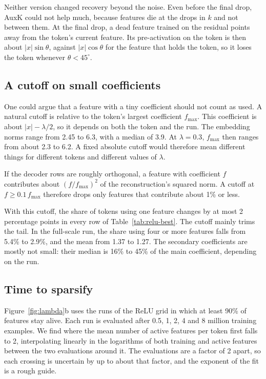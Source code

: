 \documentclass[11pt]{article}
\newcommand{\norm}[1]{\lvert #1\rvert}
\begin{document}
Neither version changed recovery beyond the noise. Even before the final drop, AuxK could not help much, because features die at the drops in $k$ and not between them. At the final drop, a dead feature trained on the residual points away from the token's current feature. Its pre-activation on the token is then about $\norm{x}\sin\theta$, against $\norm{x}\cos\theta$ for the feature that holds the token, so it loses the token whenever $\theta < 45^\circ$.

\subsection{A cutoff on small coefficients}
\label{app:cutoff}

One could argue that a feature with a tiny coefficient should not count as used. A natural cutoff is relative to the token's largest coefficient $f_{\max}$. This coefficient is about $\norm{x} - \lambda/2$, so it depends on both the token and the run. The embedding norms range from 2.45 to 6.3, with a median of 3.9. At $\lambda = 0.3$, $f_{\max}$ then ranges from about 2.3 to 6.2. A fixed absolute cutoff would therefore mean different things for different tokens and different values of $\lambda$.

If the decoder rows are roughly orthogonal, a feature with coefficient $f$ contributes about $(f/f_{\max})^2$ of the reconstruction's squared norm. A cutoff at $f \ge 0.1\,f_{\max}$ therefore drops only features that contribute about 1\% or less.

With this cutoff, the share of tokens using one feature changes by at most 2 percentage points in every row of Table~\ref{tab:relu-best}. The cutoff mainly trims the tail. In the full-scale run, the share using four or more features falls from 5.4\% to 2.9\%, and the mean from 1.37 to 1.27. The secondary coefficients are mostly not small: their median is 16\% to 45\% of the main coefficient, depending on the run.

\subsection{Time to sparsify}

Figure~\ref{fig:lambda}b uses the runs of the ReLU grid in which at least 90\% of features stay alive. Each run is evaluated after 0.5, 1, 2, 4 and 8 million training examples. We find where the mean number of active features per token first falls to 2, interpolating linearly in the logarithms of both training and active features between the two evaluations around it. The evaluations are a factor of 2 apart, so each crossing is uncertain by up to about that factor, and the exponent of the fit is a rough guide.
\end{document}
